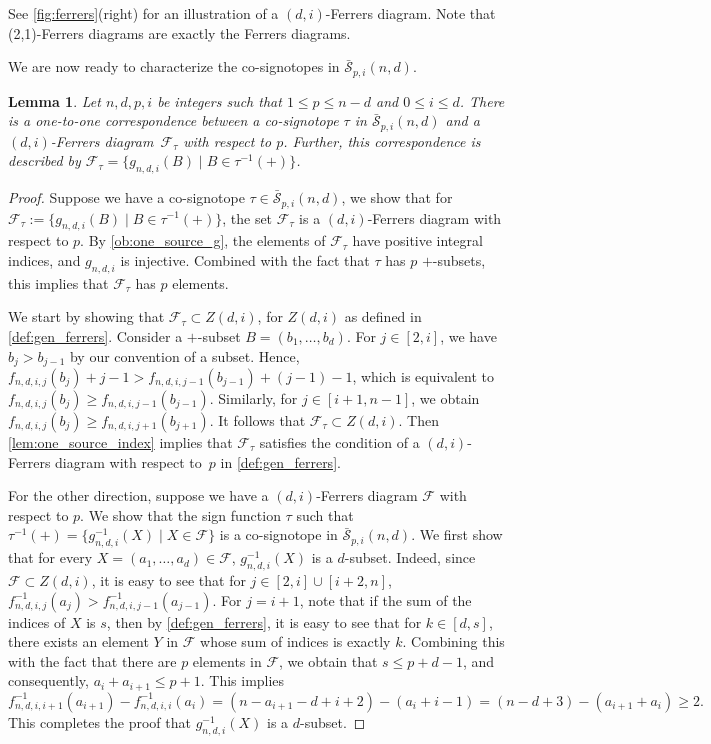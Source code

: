 \documentclass[a4paper,11pt]{amsart}
\newtheorem{lemma}[theorem]{Lemma}
\newcommand{\F}{\mathcal{F}}
\newcommand{\calS}{\mathcal{S}}
\begin{document}
See \cref{fig:ferrers}(right) for an illustration of a $(d,i)$-Ferrers diagram.
Note that (2,1)-Ferrers diagrams are exactly the Ferrers diagrams.

We are now ready to characterize the co-signotopes in $\bar{\calS}_{p,i}(n,d)$.

\begin{lemma}
\label{lem:one_source_char}
    Let $n,d,p,i$ be integers such that $1 \leq p \leq n-d$ and $0 \leq i \leq d$.
    There is a one-to-one correspondence between a co-signotope $\tau$ in $\bar{\calS}_{p,i}(n,d)$ and a $(d,i)$-Ferrers diagram~$\F_{\tau}$ with respect to $p$.
    Further, this correspondence is described by $\F_{\tau} = \{g_{n,d,i}(B) \mid B \in \tau^{-1}(+)\}$. 
\end{lemma}
\begin{proof}
    Suppose we have a co-signotope $\tau \in \bar{\calS}_{p,i}(n,d)$, we show that for $\F_{\tau} := \{g_{n,d,i}(B) \mid B \in \tau^{-1}(+)\}$, the set $\F_{\tau}$ is a $(d,i)$-Ferrers diagram with respect to $p$.
    By \cref{ob:one_source_g}, the elements of $\F_{\tau}$ have positive integral indices, and $g_{n,d,i}$ is injective.
    Combined with the fact that $\tau$ has $p$ $+$-subsets, this implies that $\F_{\tau}$ has $p$ elements.

    We start by showing that $\F_{\tau} \subset Z(d,i)$, for $Z(d,i)$ as defined in \cref{def:gen_ferrers}.
    Consider a $+$-subset $B = (b_1, \dots, b_d)$.
    For $j \in [2,i]$, we have $b_j > b_{j-1}$ by our convention of a subset.
    Hence, $f_{n,d,i,j}(b_j) + j - 1 > f_{n,d,i,j-1}(b_{j-1}) + (j-1) - 1$, which is equivalent to $f_{n,d,i,j}(b_j) \geq f_{n,d,i,j-1}(b_{j-1})$.
    Similarly, for $j \in [i+1,n-1]$, we obtain $f_{n,d,i,j}(b_j) \geq f_{n,d,i,j+1}(b_{j+1})$.
    It follows that $\F_{\tau} \subset Z(d,i)$.
    Then \cref{lem:one_source_index} implies that $\F_{\tau}$ satisfies the condition of a $(d,i)$-Ferrers diagram with respect to~$p$ in \cref{def:gen_ferrers}.

    For the other direction, suppose we have a $(d,i)$-Ferrers diagram $\F$ with respect to $p$.
    We show that the sign function $\tau$ such that $\tau^{-1}(+) = \{g^{-1}_{n,d,i}(X) \mid X \in \F\}$ is a co-signotope in $\bar{\calS}_{p,i}(n,d)$.
    We first show that for every $X = (a_1, \dots, a_d) \in \F$, $g^{-1}_{n,d,i}(X)$ is a $d$-subset.
    Indeed, since $\F \subset Z(d,i)$, it is easy to see that for $j \in [2,i] \cup [i+2,n]$, $f^{-1}_{n,d,i,j}(a_j) > f^{-1}_{n,d,i,j-1}(a_{j-1})$.
    For $j=i+1$, note that if the sum of the indices of $X$ is $s$, then by \cref{def:gen_ferrers}, it is easy to see that for $k \in [d,s]$, there exists an element $Y$ in $\F$ whose sum of indices is exactly $k$.
    Combining this with the fact that there are $p$ elements in $\F$, we obtain that $s \leq p + d - 1$, and consequently, $a_i + a_{i+1} \leq p+1$.
    This implies
    \[
        f^{-1}_{n,d,i,i+1}(a_{i+1}) - f^{-1}_{n,d,i,i}(a_{i}) = (n - a_{i+1} - d + i + 2) - (a_i + i - 1) = (n-d + 3) - (a_{i+1} + a_i) \geq 2.
    \]
    This completes the proof that $g^{-1}_{n,d,i}(X)$ is a $d$-subset.
    

\end{proof}
\end{document}
